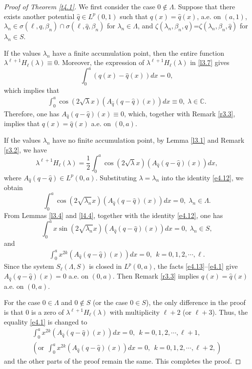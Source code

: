 \documentclass[reqno,12pt,centertags]{amsart}
\numberwithin{equation}{section}
\theoremstyle{definition}
\begin{document}
\begin{proof}[Proof of Theorem \ref{t4.1}] 
We first consider the case $0 \notin \Lambda$. 
Suppose that there exists another potential $\hat{q} \in L^p(0,1)$ such that $q(x)=\hat{q}(x)$, a.e. on $(a, 1)$, 
$\lambda_n \in \sigma(\ell, q, \beta_n) 
\cap \sigma(\ell, \hat{q}, \beta_n)$ 
for $\lambda_n \in \Lambda$, and 
$\zeta(\lambda_{n},\beta_{n}, q)$=$\zeta(\lambda_{n},\beta_{n}, \hat{q})$
for $\lambda_n \in S$.

If the values $\lambda_{n}$ have a finite accumulation point, then the entire function $\lambda^{\ell+1} H_{\ell}(\lambda) \equiv 0$. Moreover, the expression of $\lambda^{\ell+1} H_{\ell}(\lambda)$ in \eqref{l3.7} gives 
$$\int_{0}^{a}(q(x)-\hat{q}(x))dx=0,$$
which implies that 
\begin{align*}
\int_{0}^{a}\cos(2\sqrt{\lambda}x)(A_{\hat{q}}(q-\hat{q})(x))dx\equiv0,\;\lambda \in \mathbb{C}.
\end{align*}
Therefore, one has $A_{\hat{q}}(q-\hat{q})(x)\equiv0$, which, together with Remark \ref{r3.3}, implies that $q(x)=\hat{q}(x)$ a.e. on $(0, a)$.

If the values $\lambda_n$ have no finite accumulation point, by Lemma \ref{l3.1} and Remark \ref{r3.2}, we have
\begin{equation}\label{e4.12}
\lambda^{\ell+1}H_{\ell}(\lambda)
=\frac{1}{2}\int_{0}^{a} 
\cos(2\sqrt{\lambda}x)(A_{\hat{q}}(q-\hat{q})(x))dx,
\end{equation}
where $A_{\hat{q}}(q-\hat{q})\in L^{p}(0,a)$. 
Substituting $\lambda=\lambda_n$ into the identity \eqref{e4.12}, we obtain 
\begin{equation}\label{e4.13}
\int_{0}^{a}\cos(2\sqrt{\lambda_{n}}x)(A_{\hat{q}}(q-\hat{q})(x))dx=0,\; \lambda_n \in \Lambda.  
\end{equation}
From Lemmas \ref{l3.4} and \ref{l4.4}, together with the identity \eqref{e4.12}, one has 
\begin{equation}\label{e4.14}
\int_{0}^{a}x\sin(2\sqrt{\lambda_n}x)(A_{\hat{q}}(q-\hat{q})(x))dx=0,\; \lambda_n \in S, 
\end{equation}
and
\begin{align}\label{e4.1}
\int_{0}^{a}x^{2 k}(A_{\hat{q}}(q-\hat{q})(x))dx=0,~~k=0,1,2, \cdots, \ell.
\end{align}
Since the system $S_{\ell}(\Lambda, S)$ is closed in $L^p(0, a)$, the facts \eqref{e4.13}--\eqref{e4.1} give $A_{\hat{q}}(q-\hat{q})(x)=0$ a.e. on $(0,a)$. 
Then Remark \ref{r3.3} implies $q(x)=\hat{q}(x)$ a.e. on $(0, a)$.

For the case $0 \in \Lambda$ and $0 \notin S$ (or the case $0 \in S$), the only difference in the proof is that 0 is a zero of $\lambda^{\ell+1}H_{\ell}(\lambda)$ with  multiplicity $\ell+2$ (or $\ell+3$). Thus, the equality \eqref{e4.1} is changed to
\begin{gather*}
\int_{0}^{a} x^{2k}(A_{\hat{q}}(q-\hat{q})(x))dx=0,
~~k=0,1,2, \cdots, \ell+1,\\
(\text{or}~~\int_{0}^{a} x^{2k}(A_{\hat{q}}(q-\hat{q})(x))dx=0, 
~~k=0,1,2, \cdots, \ell+2,)
\end{gather*}
and the other parts of the proof remain the same. This completes the proof.
\end{proof}
\end{document}
